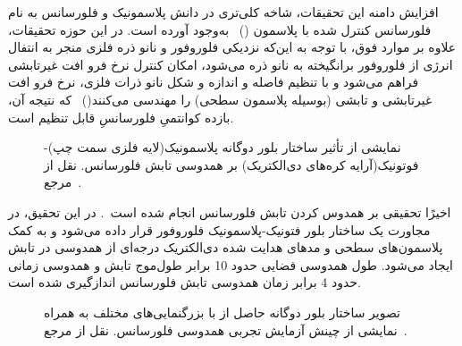 افزایش دامنه این تحقیقات، شاخه کلی‌تری در دانش پلاسمونیک و فلورسانس به نام فلورسانس کنترل شده با پلاسمون ()~\cite{doi:10.1021/jz201392k,B802918K} به‌وجود آورده است. در این حوزه تحقیقات، علاوه بر موارد فوق، با توجه به این‌که نزدیکی فلوروفور و نانو ذره فلزی منجر به انتفال انرژی از فلوروفور برانگیخته به نانو ذره می‌شود، امکان کنترل نرخ فرو افت غیرتابشی فراهم می‌شود و با تنظیم فاصله و اندازه و شکل نانو ذرات فلزی، نرخ فرو افت غیرتابشی و تابشی (بوسیله پلاسمون سطحی) را مهندسی می‌کنند()~\cite{gryczynski2004radiative,geddes2007radiative} که نتیجه آن، بازده کوانتمیِ فلورسانسِ قابل تنظیم است.


\begin{figure}[tb]
	\caption{نمایشی از تأثیر ساختار بلور دوگانه پلاسمونیک(لایه فلزی سمت چپ)-فوتونیک(آرایه کره‌های دی‌الکتریک) بر همدوسی تابش فلورسانس. نقل از مرجع~\cite{shi2014coherent}.\label{fig3_1}}
\end{figure}

اخیرًا تحقیقی بر همدوس کردن تابش فلورسانس انجام شده است~\cite{shi2014coherent}. در این تحقیق، در مجاورت یک ساختار بلور فتونیک-پلاسمونیک فلوروفور قرار داده می‌شود و به کمک پلاسمون‌های سطحی و مدهای هدایت شده دی‌الکتریک درجه‌ای از همدوسی در تابش ایجاد می‌شود. طول همدوسی فضایی حدود 10 برابر طول‌موج تابش و همدوسی زمانی حدود 4 برابر زمان همدوسی تابش فلورسانس اندازگیری شده است.

\begin{figure}[tb]
	\caption{تصویر ساختار بلور دوگانه حاصل از  با بزرگنمایی‌های مختلف به همراه نمایشی از چینش آزمایش تجربی همدوسی فلورسانس. نقل از مرجع~\cite{shi2014coherent}.}\label{fig3_1}
\end{figure}


